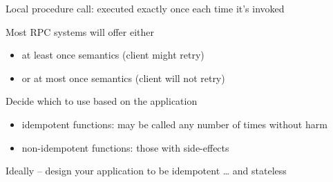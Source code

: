 \begin{slide}

	
	Local procedure call: executed exactly once each time it's invoked
	\bigskip
	
	Most RPC systems will offer either
	\begin{itemize}
		\item at least once semantics (client might retry)
		\item or at most once semantics (client will not retry)
	\end{itemize}
	\bigskip
	
	Decide which to use based on the application
	\begin{itemize}
		\item idempotent functions: may be called any number of times without harm
		\item non-idempotent functions: those with side-effects
	\end{itemize}
	\bigskip
	
	Ideally – design your application to be idempotent … and stateless
	
\end{slide}


